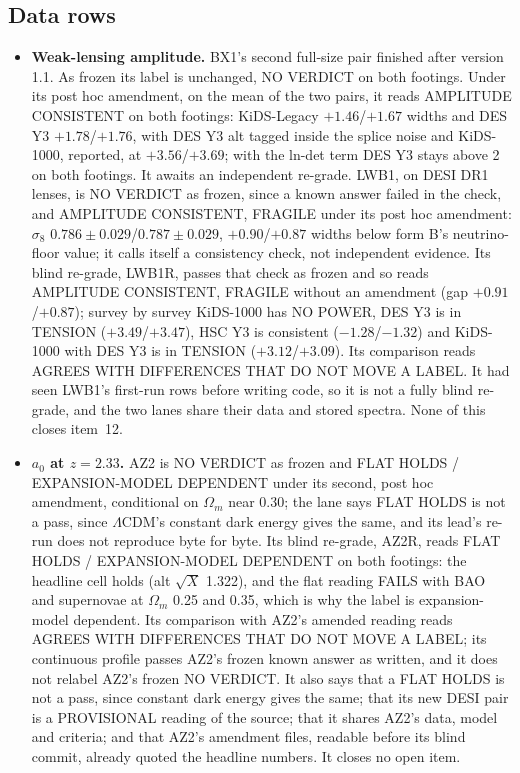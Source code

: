 \documentclass[10pt]{article}
\begin{document}
\subsection{Data rows}
\begin{itemize}
\item \textbf{Weak-lensing amplitude.} BX1's second full-size pair finished after version 1.1. As frozen its label is unchanged, NO VERDICT on both footings. Under its post hoc amendment, on the mean of the two pairs, it reads AMPLITUDE CONSISTENT on both footings: KiDS-Legacy $+1.46$/$+1.67$ widths and DES Y3 $+1.78$/$+1.76$, with DES Y3 alt tagged inside the splice noise and KiDS-1000, reported, at $+3.56$/$+3.69$; with the ln-det term DES Y3 stays above 2 on both footings. It awaits an independent re-grade. LWB1, on DESI DR1 lenses, is NO VERDICT as frozen, since a known answer failed in the check, and AMPLITUDE CONSISTENT, FRAGILE under its post hoc amendment: $\sigma_8$ $0.786\pm0.029$/$0.787\pm0.029$, $+0.90$/$+0.87$ widths below form B's neutrino-floor value; it calls itself a consistency check, not independent evidence. Its blind re-grade, LWB1R, passes that check as frozen and so reads AMPLITUDE CONSISTENT, FRAGILE without an amendment (gap $+0.91$/$+0.87$); survey by survey KiDS-1000 has NO POWER, DES Y3 is in TENSION ($+3.49$/$+3.47$), HSC Y3 is consistent ($-1.28$/$-1.32$) and KiDS-1000 with DES Y3 is in TENSION ($+3.12$/$+3.09$). Its comparison reads AGREES WITH DIFFERENCES THAT DO NOT MOVE A LABEL. It had seen LWB1's first-run rows before writing code, so it is not a fully blind re-grade, and the two lanes share their data and stored spectra. None of this closes item~12.
\item \textbf{$a_0$ at $z=2.33$.} AZ2 is NO VERDICT as frozen and FLAT HOLDS / EXPANSION-MODEL DEPENDENT under its second, post hoc amendment, conditional on $\Omega_m$ near 0.30; the lane says FLAT HOLDS is not a pass, since $\Lambda$CDM's constant dark energy gives the same, and its lead's re-run does not reproduce byte for byte. Its blind re-grade, AZ2R, reads FLAT HOLDS / EXPANSION-MODEL DEPENDENT on both footings: the headline cell holds (alt $\sqrt{X}$ 1.322), and the flat reading FAILS with BAO and supernovae at $\Omega_m$ 0.25 and 0.35, which is why the label is expansion-model dependent. Its comparison with AZ2's amended reading reads AGREES WITH DIFFERENCES THAT DO NOT MOVE A LABEL; its continuous profile passes AZ2's frozen known answer as written, and it does not relabel AZ2's frozen NO VERDICT. It also says that a FLAT HOLDS is not a pass, since constant dark energy gives the same; that its new DESI pair is a PROVISIONAL reading of the source; that it shares AZ2's data, model and criteria; and that AZ2's amendment files, readable before its blind commit, already quoted the headline numbers. It closes no open item.

\end{itemize}
\end{document}
